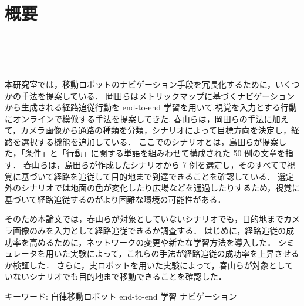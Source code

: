 \chapter*{概要}
\thispagestyle{empty}
%
\begin{center}
  \scalebox{1.0}{視覚と行動のend-to-end学習により}\\
  \vspace{-1.0zh}
  \scalebox{1.0}{経路追従行動を模倣する手法の提案}\\
  \scalebox{1.0}{-経路選択の成功率向上を意図したネットワークの変更と実験的評価-}\\
\end{center}
\vspace{1.0zh}

本研究室では，移動ロボットのナビゲーション手段を冗長化するために，いくつかの手法を提案している．
岡田らはメトリックマップに基づくナビゲーションから生成される経路追従行動を end-to-end 学習を用いて,視覚を入力とする行動にオンラインで模倣する手法を提案してきた.
春山らは，岡田らの手法に加えて，カメラ画像から通路の種類を分類，シナリオによって目標方向を決定し，経路を選択する機能を追加している．
ここでのシナリオとは，島田らが提案した，「条件」と「行動」に関する単語を組みわせて構成された 50 例の文章を指す．
春山らは，島田ら\cite{Shimada2020}が作成したシナリオから 7 例を選定し，そのすべてで視覚に基づいて経路を追従して目的地まで到達できることを確認している．
選定外のシナリオでは地面の色が変化したり広場などを通過したりするため，視覚に基づいて経路追従するのがより困難な環境の可能性がある．

そのため本論文では，春山らが対象としていないシナリオでも，目的地までカメラ画像のみを入力として経路追従できるか調査する．
はじめに，経路追従の成功率を高めるために，ネットワークの変更や新たな学習方法を導入した．
シミュレータを用いた実験によって，これらの手法が経路追従の成功率を上昇させるか検証した．
さらに，実ロボットを用いた実験によって，春山らが対象としていないシナリオでも目的地まで移動できることを確認した．

キーワード: 自律移動ロボット end-to-end 学習 ナビゲーション
%
\newpage
